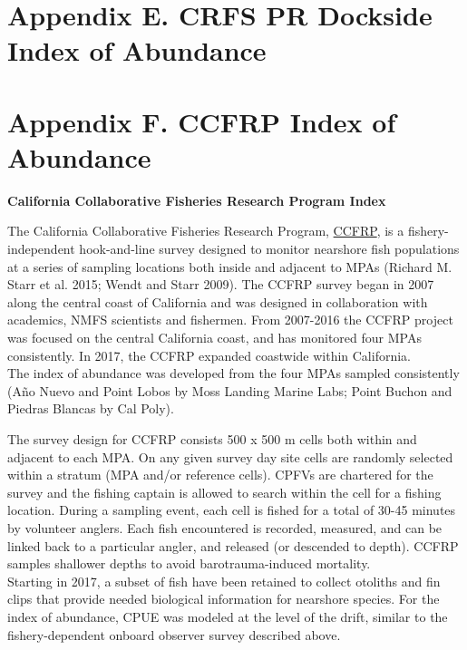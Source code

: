 \documentclass[11pt,
  english,
  letterpaper,
]{article}
\begin{document}
\hypertarget{crfs-pr-index}{%
\section{Appendix E. CRFS PR Dockside Index of Abundance}\label{crfs-pr-index}}

\hypertarget{ccfrp-index}{%
\section{Appendix F. CCFRP Index of Abundance}\label{ccfrp-index}}

\textbf{California Collaborative Fisheries Research Program Index}

The California Collaborative Fisheries Research Program, \href{https://www.mlml.calstate.edu/ccfrp/}{CCFRP}, is a fishery-independent hook-and-line survey designed to monitor nearshore fish populations at a series of sampling locations both inside and adjacent to MPAs (Richard M. Starr et al. 2015; Wendt and Starr 2009). The CCFRP survey began in 2007 along the central coast of California and was designed in collaboration with academics, NMFS scientists and fishermen. From 2007-2016 the CCFRP project was focused on the central California coast, and has monitored four MPAs consistently. In 2017, the CCFRP expanded coastwide within California.\\
The index of abundance was developed from the four MPAs sampled consistently (Año Nuevo and Point Lobos by Moss Landing Marine Labs; Point Buchon and Piedras Blancas by Cal Poly).

The survey design for CCFRP consists 500 x 500 m cells both within and adjacent to each MPA. On any given survey day site cells are randomly selected within a stratum (MPA and/or reference cells). CPFVs are chartered for the survey and the fishing captain is allowed to search within the cell for a fishing location. During a sampling event, each cell is fished for a total of 30-45 minutes by volunteer anglers. Each fish encountered is recorded, measured, and can be linked back to a particular angler, and released (or descended to depth). CCFRP samples shallower depths to avoid barotrauma-induced mortality.\\
Starting in 2017, a subset of fish have been retained to collect otoliths and fin clips that provide needed biological information for nearshore species. For the index of abundance, CPUE was modeled at the level of the drift, similar to the fishery-dependent onboard observer survey described above.
\end{document}
